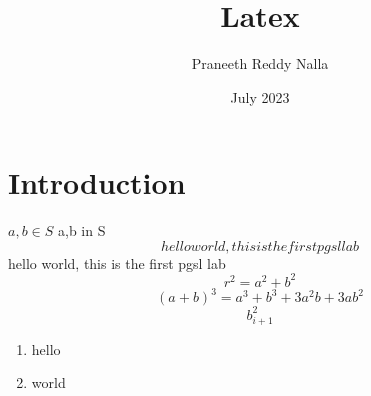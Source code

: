 \documentclass{article}
\title{Latex}
\author{Praneeth Reddy Nalla}
\date{July 2023}
\begin{document}
\maketitle

\section{Introduction}

$a,b\in S $
a,b in S 
\[ hello world, this is the first pgsl lab\]
hello world, this is the first pgsl lab
\begin{equation*}
r^2 = a^2+b^2

\end{equation*}
\begin{equation}
(a+b)^3 = a^3+b^3+3a^2b+3ab^2
\end{equation}
\begin{equation}
b_{i+1}^2
\end{equation}
\begin{enumerate}
\item hello
\item world
\end{enumerate}
\end{document}
